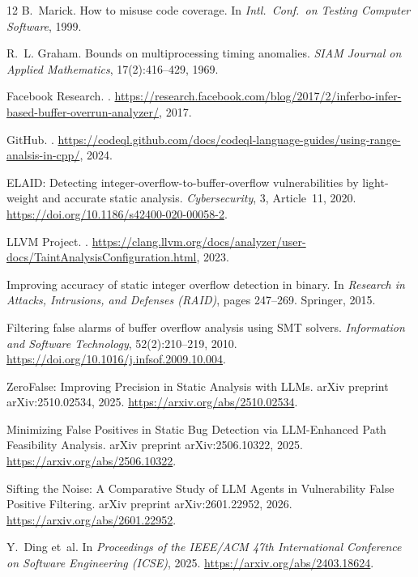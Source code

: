\begin{thebibliography}{12}
B.~Marick.
\newblock How to misuse code coverage.
\newblock In \emph{Intl.\ Conf.\ on Testing Computer Software}, 1999.

R.~L. Graham.
\newblock Bounds on multiprocessing timing anomalies.
\newblock \emph{SIAM Journal on Applied Mathematics}, 17(2):416--429, 1969.

{Facebook Research}.
.
\newblock \url{https://research.facebook.com/blog/2017/2/inferbo-infer-based-buffer-overrun-analyzer/}, 2017.

{GitHub}.
.
\newblock \url{https://codeql.github.com/docs/codeql-language-guides/using-range-analsis-in-cpp/}, 2024.

{ELAID: Detecting integer-overflow-to-buffer-overflow vulnerabilities by
  light-weight and accurate static analysis}.
\newblock \emph{Cybersecurity}, 3, Article~11, 2020.
\newblock \url{https://doi.org/10.1186/s42400-020-00058-2}.

{LLVM Project}.
.
\newblock \url{https://clang.llvm.org/docs/analyzer/user-docs/TaintAnalysisConfiguration.html}, 2023.

{Improving accuracy of static integer overflow detection in binary}.
\newblock In \emph{Research in Attacks, Intrusions, and Defenses (RAID)},
  pages 247--269. Springer, 2015.

{Filtering false alarms of buffer overflow analysis using SMT solvers}.
\newblock \emph{Information and Software Technology}, 52(2):210--219, 2010.
\newblock \url{https://doi.org/10.1016/j.infsof.2009.10.004}.

{ZeroFalse: Improving Precision in Static Analysis with LLMs}.
\newblock arXiv preprint arXiv:2510.02534, 2025.
\newblock \url{https://arxiv.org/abs/2510.02534}.

{Minimizing False Positives in Static Bug Detection via LLM-Enhanced Path
  Feasibility Analysis}.
\newblock arXiv preprint arXiv:2506.10322, 2025.
\newblock \url{https://arxiv.org/abs/2506.10322}.

{Sifting the Noise: A Comparative Study of LLM Agents in Vulnerability False
  Positive Filtering}.
\newblock arXiv preprint arXiv:2601.22952, 2026.
\newblock \url{https://arxiv.org/abs/2601.22952}.

Y.~Ding et~al.
\newblock In \emph{Proceedings of the IEEE/ACM 47th International Conference on
  Software Engineering (ICSE)}, 2025.
\newblock \url{https://arxiv.org/abs/2403.18624}.

\end{thebibliography}

